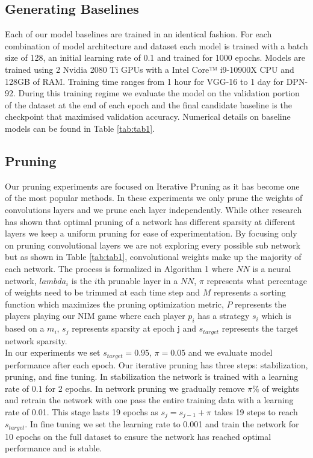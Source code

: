 \documentclass[runningheads]{llncs}
\begin{document}
\subsection{Generating Baselines}
Each of our model baselines are trained in an identical fashion. For each combination of model architecture and dataset each model is trained with a batch size of 128, an initial learning rate of 0.1 and trained for 1000 epochs. Models are trained using 2 Nvidia 2080 Ti GPUs with a  Intel Core™ i9-10900X CPU and 128GB of RAM. Training time ranges from 1 hour for VGG-16 to 1 day for DPN-92. During this training regime we evaluate the model on the validation portion of the dataset at the end of each epoch and the final candidate baseline is the checkpoint that maximised validation accuracy. Numerical details on baseline models can be found in Table \ref{tab:tab1}.
\subsection{Pruning}
Our pruning experiments are focused on Iterative Pruning as it has become one of the most popular methods. In these experiments we only prune the weights of convolutions layers and we prune each layer independently. While other research has shown that optimal pruning of a network has different sparsity at different layers \cite{Blalock2020WhatIT} we keep a uniform pruning for ease of experimentation. By focusing only on pruning convolutional layers we are not exploring every possible sub network but as shown in Table \ref{tab:tab1}, convolutional weights make up the majority of each network. The process is formalized in Algorithm 1 where $NN$ is a neural network, $lambda_i$ is the $i$th prunable layer in a $NN$, $\pi$ represents what percentage of weights need to be trimmed at each time step and $M$ represents a sorting function which maximizes the pruning optimization metric, $P$ represents the players playing our NIM game where each player $p_i$ has a strategy $s_i$ which is based on a $m_i$, $s_j$ represents sparsity at epoch j and $s_{target}$ represents the target network sparsity. \\
In our experiments we set $s_{target} = 0.95$, $\pi=0.05$ and we evaluate model performance after each epoch. Our iterative pruning has three steps: stabilization, pruning, and fine tuning. In stabilization the network is trained with a learning rate of $0.1$ for 2 epochs. In network pruning we gradually remove $\pi\%$ of  weights and retrain the network with one pass the entire training data with a learning rate of 0.01. This stage lasts 19 epochs as $s_j = s_{j-1} + \pi$ takes 19 steps to reach $s_{target}$. In fine tuning we set the learning rate to 0.001 and train the network for 10 epochs on the full dataset to ensure the network has reached optimal performance and is stable. \\
\end{document}
